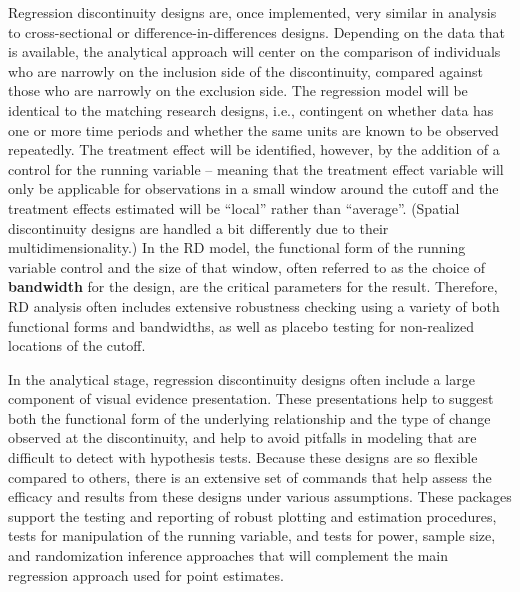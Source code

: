 Regression discontinuity designs are, once implemented,
very similar in analysis to cross-sectional or difference-in-differences designs.
Depending on the data that is available,
the analytical approach will center on the comparison of individuals
who are narrowly on the inclusion side of the discontinuity,
compared against those who are narrowly on the exclusion side.
The regression model will be identical to the matching research designs,
i.e., contingent on whether data has one or more time periods
and whether the same units are known to be observed repeatedly.
The treatment effect will be identified, however, by the addition of a control
for the running variable -- meaning that the treatment effect variable
will only be applicable for observations in a small window around the cutoff
and the treatment effects estimated will be ``local'' rather than ``average''.
(Spatial discontinuity designs are handled a bit differently due to their multidimensionality.)
In the RD model, the functional form of the running variable control and the size of that window,
often referred to as the choice of \textbf{bandwidth} for the design,
are the critical parameters for the result.\cite{calonico2019regression}
Therefore, RD analysis often includes extensive robustness checking
using a variety of both functional forms and bandwidths,
as well as placebo testing for non-realized locations of the cutoff.

In the analytical stage, regression discontinuity designs
often include a large component of visual evidence presentation.
These presentations help to suggest both the functional form
of the underlying relationship and the type of change observed at the discontinuity,
and help to avoid pitfalls in modeling that are difficult to detect with hypothesis tests.
Because these designs are so flexible compared to others,
there is an extensive set of commands that help assess
the efficacy and results from these designs under various assumptions.
These packages support the testing and reporting
of robust plotting and estimation procedures,
tests for manipulation of the running variable,
and tests for power, sample size, and randomization inference approaches
that will complement the main regression approach used for point estimates.


